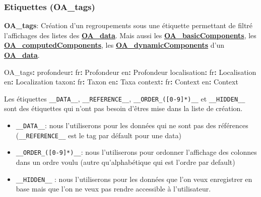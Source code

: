 \documentclass[
  letterpaper,
  DIV=11,
  numbers=noendperiod]{scrartcl}
\author{}
\date{}
\newenvironment{Shaded}{\begin{snugshade}}{\end{snugshade}}
\newcommand{\AttributeTok}[1]{\textcolor[rgb]{0.40,0.45,0.13}{#1}}
\newcommand{\FunctionTok}[1]{\textcolor[rgb]{0.28,0.35,0.67}{#1}}
\newcommand{\KeywordTok}[1]{\textcolor[rgb]{0.00,0.23,0.31}{\textbf{#1}}}
\providecommand{\tightlist}{%
  \setlength{\itemsep}{0pt}\setlength{\parskip}{0pt}}\usepackage{longtable,booktabs,array}
\begin{document}
\subsubsection{Etiquettes (OA\_tags)}\label{etiquettes-oa_tags}

\textbf{OA\_tags}: Création d'un regroupements sous une étiquette
permettant de filtré l'affichages des listes des
\hyperref[data]{\textbf{OA\_data}}. Mais aussi les
\hyperref[basicComponents]{\textbf{OA\_basicComponents}}, les
\hyperref[computedComponents]{\textbf{OA\_computedComponents}}, les
\hyperref[dynamicComponents]{\textbf{OA\_dynamicComponents}} d'un
\hyperref[data]{\textbf{OA\_data}}.

\begin{Shaded}
\begin{Highlighting}[]
\FunctionTok{OA\_tags}\KeywordTok{:}
\AttributeTok{  }\FunctionTok{profondeur}\KeywordTok{:}
\AttributeTok{    }\FunctionTok{fr}\KeywordTok{:}\AttributeTok{ Profondeur}
\AttributeTok{    }\FunctionTok{en}\KeywordTok{:}\AttributeTok{ Profondeur}
\AttributeTok{  }\FunctionTok{localisation}\KeywordTok{:}
\AttributeTok{    }\FunctionTok{fr}\KeywordTok{:}\AttributeTok{ Localisation}
\AttributeTok{    }\FunctionTok{en}\KeywordTok{:}\AttributeTok{ Localization}
\AttributeTok{  }\FunctionTok{taxon}\KeywordTok{:}
\AttributeTok{    }\FunctionTok{fr}\KeywordTok{:}\AttributeTok{ Taxon}
\AttributeTok{    }\FunctionTok{en}\KeywordTok{:}\AttributeTok{ Taxa}
\AttributeTok{  }\FunctionTok{context}\KeywordTok{:}
\AttributeTok{    }\FunctionTok{fr}\KeywordTok{:}\AttributeTok{ Context}
\AttributeTok{    }\FunctionTok{en}\KeywordTok{:}\AttributeTok{ Context}
\end{Highlighting}
\end{Shaded}

Les étiquettes \texttt{\_\_DATA\_\_}, \texttt{\_\_REFERENCE\_\_},
\texttt{\_\_ORDER\_({[}0-9{]}*)\_\_} et \texttt{\_\_HIDDEN\_\_} sont des
étiquettes qui n'ont pas besoin d'êtres mise dans la liste de création.

\begin{itemize}
\tightlist
\item
  \texttt{\_\_DATA\_\_}: nous l'utiliserons pour les données qui ne sont
  pas des références (\texttt{\_\_REFERENCE\_\_} est le tag par défault
  pour une data)
\item
  \texttt{\_\_ORDER\_({[}0-9{]}*)\_\_}: nous l'utiliserons pour ordonner
  l'affichage des colonnes dans un ordre voulu (autre qu'alphabétique
  qui est l'ordre par default)
\item
  \texttt{\_\_HIDDEN\_\_} : nous l'utiliserons pour les données que l'on
  veux enregistrer en base mais que l'on ne veux pas rendre accessible à
  l'utilisateur.
\end{itemize}
\end{document}
